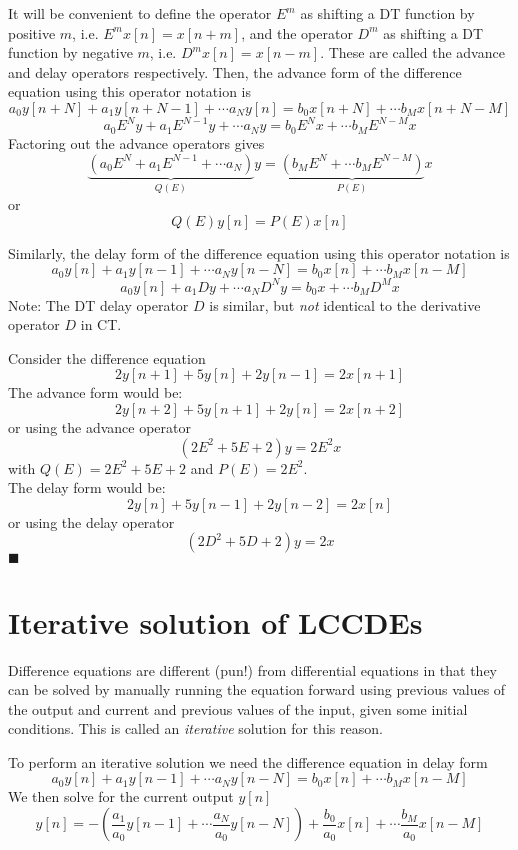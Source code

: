 It will be convenient to define the operator $E^m$ as shifting a DT function by positive $m$, i.e. $E^m x[n] = x[n+m]$, and the operator $D^m$ as shifting a DT function by negative $m$, i.e. $D^m x[n] = x[n-m]$. These are called the advance and delay operators respectively. Then, the advance form of the difference equation using this operator notation is
\[
a_0y[n+N] + a_1y[n+N-1] + \cdots a_N y[n] = b_0 x[n+N] + \cdots b_Mx[n+N-M]
\]
\[
a_0 E^Ny + a_1E^{N-1}y + \cdots a_N y = b_0 E^{N}x + \cdots b_M E^{N-M}x
\]
Factoring out the advance operators gives
\[
\underbrace{\left(a_0E^N + a_1E^{N-1} + \cdots a_N\right)}_{Q(E)} y = \underbrace{\left(b_M E^{N} + \cdots b_M E^{N-M}\right)}_{P(E)} x
\]
or
\[
Q(E)y[n] = P(E)x[n]
\]

Similarly, the delay form of the difference equation using this operator notation is
\[
a_0y[n] + a_1y[n-1] + \cdots a_N y[n-N] = b_0 x[n] + \cdots b_Mx[n-M]
\]
\[
a_0y[n] + a_1 Dy + \cdots a_N D^N y = b_0 x + \cdots b_MD^M x
\]
Note: The DT delay operator $D$ is similar, but \emph{not} identical to the derivative operator $D$ in CT.

\begin{example}
  Consider the difference equation
  \[
  2y[n+1] + 5y[n] + 2y[n-1] = 2x[n+1]
  \]
  The advance form would be:
  \[
  2y[n+2] + 5y[n+1] + 2y[n] = 2x[n+2]
  \]
  or using the advance operator
  \[
  \left(2E^2 + 5E + 2\right)y = 2E^2x
  \]
  with $Q(E) = 2E^2 + 5E + 2$ and $P(E) = 2E^2$.\\[1em]
  The delay form would be:
  \[
  2y[n] + 5y[n-1] + 2y[n-2] = 2x[n]
  \]
  or using the delay operator
  \[
  \left(2D^2 + 5D + 2\right)y = 2x
  \]
$\blacksquare$
\end{example}

\section{Iterative solution of LCCDEs}

Difference equations are different (pun!) from differential equations in that they can be solved by manually running the equation forward using previous values of the output and current and previous values of the input, given some initial conditions. This is called an \emph{iterative} solution for this reason.

To perform an iterative solution we need the difference equation in delay form
\[
a_0y[n] + a_1y[n-1] + \cdots a_N y[n-N] = b_0 x[n] + \cdots b_Mx[n-M]
\]
We then solve for the current output $y[n]$
\[
y[n] =  - \left(\frac{a_1}{a_0}y[n-1] + \cdots \frac{a_N}{a_0} y[n-N]\right) + \frac{b_0}{a_0} x[n] + \cdots \frac{b_M}{a_0}x[n-M]
\]

